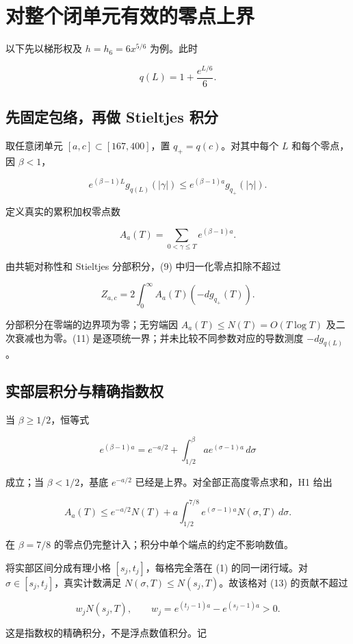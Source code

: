 \documentclass[UTF8,zihao=-4,fontset=fandol]{ctexart}
\begin{document}
\section{对整个闭单元有效的零点上界}

以下先以梯形权及 \(h=h_6=6x^{5/6}\) 为例。此时

\[
q(L)=1+\frac{e^{L/6}}6.
\]

\subsection{先固定包络，再做 Stieltjes 积分}

取任意闭单元 \([a,c]\subset[167,400]\)，置 \(q_+=q(c)\)。对其中每个 \(L\) 和每个零点，因 \(\beta<1\)，

\[
e^{(\beta-1)L}g_{q(L)}(|\gamma|)
\le e^{(\beta-1)a}g_{q_+}(|\gamma|). \tag{11}
\]

定义真实的累积加权零点数

\[
A_a(T)=\sum_{0<\gamma\le T}e^{(\beta-1)a}.
\]

由共轭对称性和 Stieltjes 分部积分，(9) 中归一化零点扣除不超过

\[
Z_{a,c}=2\int_0^\infty A_a(T)(-dg_{q_+}(T)). \tag{12}
\]

分部积分在零端的边界项为零；无穷端因 \(A_a(T)\le N(T)=O(T\log T)\) 及二次衰减也为零。(11) 是逐项统一界；并未比较不同参数对应的导数测度 \(-dg_{q(L)}\)。

\subsection{实部层积分与精确指数权}

当 \(\beta\ge1/2\)，恒等式

\[
e^{(\beta-1)a}=e^{-a/2}+\int_{1/2}^{\beta}a e^{(\sigma-1)a}\,d\sigma
\]

成立；当 \(\beta<1/2\)，基底 \(e^{-a/2}\) 已经是上界。对全部正高度零点求和，H1 给出

\[
A_a(T)\le e^{-a/2}N(T)
+a\int_{1/2}^{7/8}e^{(\sigma-1)a}N(\sigma,T)\,d\sigma. \tag{13}
\]

在 \(\beta=7/8\) 的零点仍完整计入；积分中单个端点的约定不影响数值。

将实部区间分成有理小格 \([s_j,t_j]\)，每格完全落在 (1) 的同一闭行域。对 \(\sigma\in[s_j,t_j]\)，真实计数满足 \(N(\sigma,T)\le N(s_j,T)\)。故该格对 (13) 的贡献不超过

\[
w_jN(s_j,T),\qquad
w_j=e^{(t_j-1)a}-e^{(s_j-1)a}>0. \tag{14}
\]

这是指数权的精确积分，不是浮点数值积分。记
\end{document}
